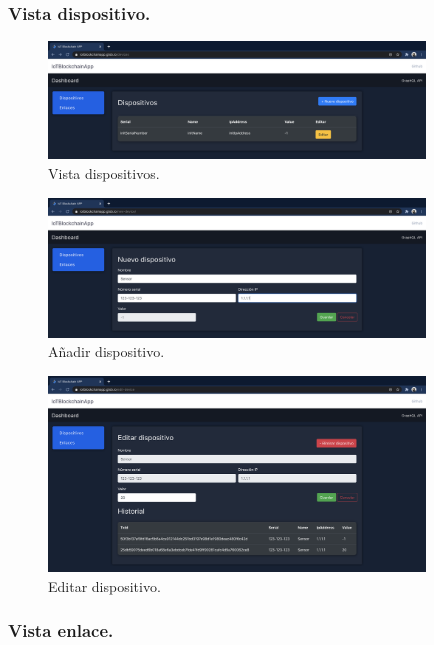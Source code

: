 \subsubsection*{Vista dispositivo.}

\begin{figure}[ht!]
  \centering
  \includegraphics[width=10cm]{imagenes/desarrollo/web/vista_dispositivos}
  \caption{Vista dispositivos.}
  \label{fig:vista-dispositivo}
\end{figure}

\begin{figure}[ht!]
  \centering
  \includegraphics[width=10cm]{imagenes/desarrollo/web/aniadir_dispositivo}
  \caption{Añadir dispositivo.}
  \label{fig:aniadir-dispositivo}
\end{figure}

\begin{figure}[ht!]
  \centering
  \includegraphics[width=10cm]{imagenes/desarrollo/web/editar_dispositivo}
  \caption{Editar dispositivo.}
  \label{fig:editar-dispositivo}
\end{figure}

\subsubsection*{Vista enlace.}

